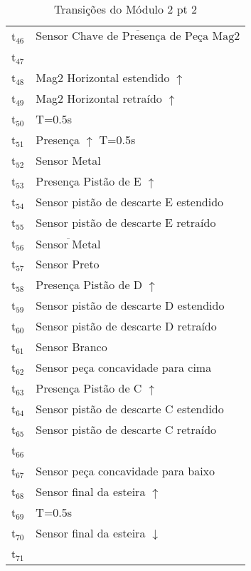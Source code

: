 \begin{table}[htbp]
\caption{Transições do Módulo 2 pt 2}
\centering
\begin{tabular}{ll}
t\(_{\text{46}}\) & \(\overline{\mbox{Sensor Chave de Presença de Peça Mag2}}\)\\
t\(_{\text{47}}\) & \\
t\(_{\text{48}}\) & Mag2 Horizontal estendido \(\uparrow\)\\
t\(_{\text{49}}\) & Mag2 Horizontal retraído \(\uparrow\)\\
t\(_{\text{50}}\) & T=0.5s\\
t\(_{\text{51}}\) & Presença \(\uparrow\) T=0.5s\\
t\(_{\text{52}}\) & Sensor Metal\\
t\(_{\text{53}}\) & Presença Pistão de E \(\uparrow\)\\
t\(_{\text{54}}\) & Sensor pistão de descarte E estendido\\
t\(_{\text{55}}\) & Sensor pistão de descarte E retraído\\
t\(_{\text{56}}\) & \(\overline{\mbox{Sensor Metal}}\)\\
t\(_{\text{57}}\) & Sensor Preto\\
t\(_{\text{58}}\) & Presença Pistão de D \(\uparrow\)\\
t\(_{\text{59}}\) & Sensor pistão de descarte D estendido\\
t\(_{\text{60}}\) & Sensor pistão de descarte D retraído\\
t\(_{\text{61}}\) & Sensor Branco\\
t\(_{\text{62}}\) & Sensor peça concavidade para cima\\
t\(_{\text{63}}\) & Presença Pistão de C \(\uparrow\)\\
t\(_{\text{64}}\) & Sensor pistão de descarte C estendido\\
t\(_{\text{65}}\) & Sensor pistão de descarte C retraído\\
t\(_{\text{66}}\) & \\
t\(_{\text{67}}\) & Sensor peça concavidade para baixo\\
t\(_{\text{68}}\) & Sensor final da esteira \(\uparrow\)\\
t\(_{\text{69}}\) & T=0.5s\\
t\(_{\text{70}}\) & Sensor final da esteira \(\downarrow\)\\
t\(_{\text{71}}\) & \\
\end{tabular}
\end{table}
